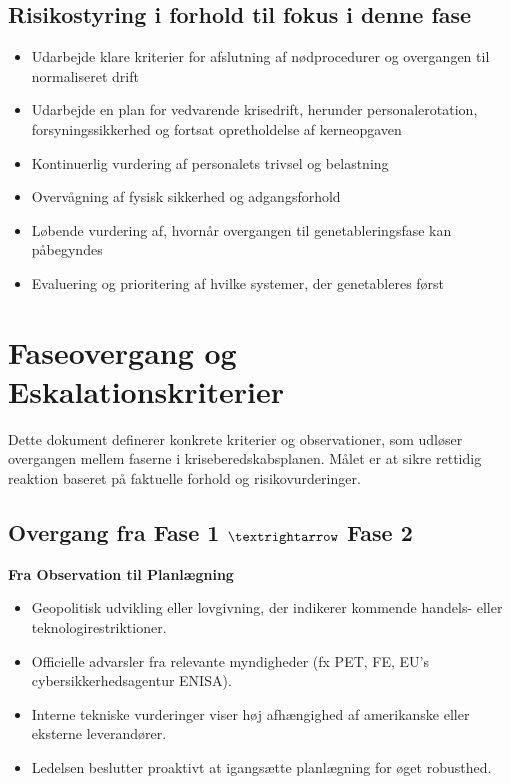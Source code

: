 \documentclass[a4paper,11pt,oneside]{book}
\def\tightlist{}
\begin{document}
\section{Risikostyring i forhold til fokus i denne
fase}\label{risikostyring-i-forhold-til-fokus-i-denne-fase}

\begin{itemize}
\tightlist
\item
  Udarbejde klare kriterier for afslutning af nødprocedurer og
  overgangen til normaliseret drift
\item
  Udarbejde en plan for vedvarende krisedrift, herunder
  personalerotation, forsyningssikkerhed og fortsat opretholdelse af
  kerneopgaven
\item
  Kontinuerlig vurdering af personalets trivsel og belastning
\item
  Overvågning af fysisk sikkerhed og adgangsforhold
\item
  Løbende vurdering af, hvornår overgangen til genetableringsfase kan
  påbegyndes
\item
  Evaluering og prioritering af hvilke systemer, der genetableres først
\end{itemize}

\newpage

\chapter{Faseovergang og
Eskalationskriterier}\label{faseovergang-og-eskalationskriterier}

Dette dokument definerer konkrete kriterier og observationer, som
udløser overgangen mellem faserne i kriseberedskabsplanen. Målet er at
sikre rettidig reaktion baseret på faktuelle forhold og
risikovurderinger.

\section{\texorpdfstring{Overgang fra Fase 1 \(\textrightarrow\) Fase
2}{Overgang fra Fase 1 \textbackslash textrightarrow Fase 2}}\label{overgang-fra-fase-1-textrightarrow-fase-2}

\textbf{Fra Observation til Planlægning}

\begin{itemize}
\tightlist
\item
  Geopolitisk udvikling eller lovgivning, der indikerer kommende
  handels- eller teknologirestriktioner.
\item
  Officielle advarsler fra relevante myndigheder (fx PET, FE, EU's
  cybersikkerhedsagentur ENISA).
\item
  Interne tekniske vurderinger viser høj afhængighed af amerikanske
  eller eksterne leverandører.
\item
  Ledelsen beslutter proaktivt at igangsætte planlægning for øget
  robusthed.
\end{itemize}
\end{document}

